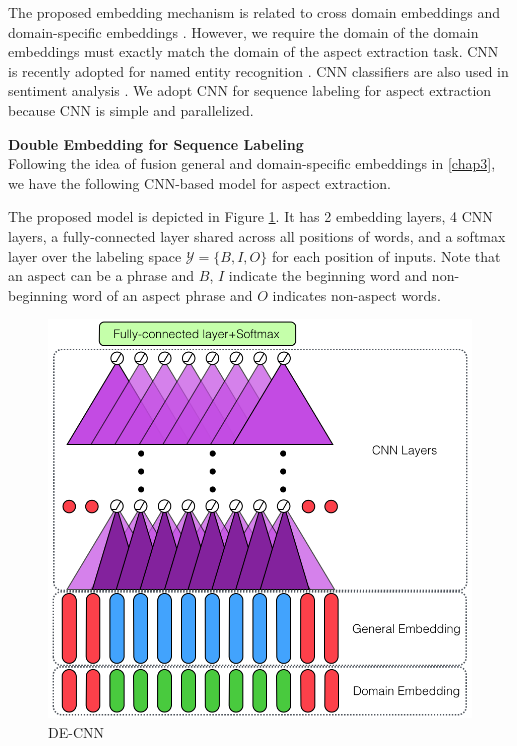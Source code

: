 The proposed embedding mechanism is related to cross domain embeddings \cite{bollegala2015unsupervised,bollegala2017think} and domain-specific embeddings \cite{xumeta,Xu2018pro}. 
However, we require the domain of the domain embeddings must exactly match the domain of the aspect extraction task. 
CNN \cite{lecun1995convolutional,kim2014convolutional} is recently adopted for named entity recognition \cite{strubell2017fast}.
CNN classifiers are also used in sentiment analysis \cite{poria2016aspect,chen2017improving}.
We adopt CNN for sequence labeling for aspect extraction because CNN is simple and parallelized.

\textbf{Double Embedding for Sequence Labeling}\\
Following the idea of fusion general and domain-specific embeddings in \ref{chap3}, we have the following CNN-based model for aspect extraction.

The proposed model is depicted in Figure \ref{chap3:fig:fr}.
It has 2 embedding layers, 4 CNN layers, a fully-connected layer shared across all positions of words, and a softmax layer over the labeling space $\mathcal{Y}=\{B, I, O\}$ for each position of inputs.
Note that an aspect can be a phrase and $B$, $I$ indicate the beginning word and non-beginning word of an aspect phrase and $O$ indicates non-aspect words.

\begin{figure}[H]
\centering    
\includegraphics[width=5.in]{fig/acl18_fig.png}
    \caption{DE-CNN}
    \label{chap3:fig:fr}
\end{figure}

